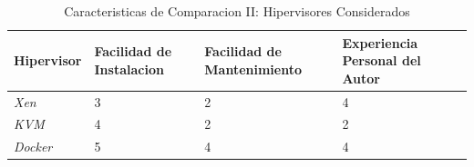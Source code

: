 \begin{table}
	\centering
	\begin{tabular}{|p{1.85cm}|p{2.2cm}|p{3.0cm}|p{1.9cm}|}
    	\hline
		\textbf{Hipervisor} & \textbf{Facilidad de Instalacion} & \textbf{Facilidad de Mantenimiento} & \textbf{Experiencia Personal del Autor} \\
        \hline
        \textit{Xen} & 3 & 2 & 4 \\
        \hline
        \textit{KVM} & 4 & 2 & 2 \\
        \hline
        \textit{Docker} & 5 & 4 & 4 \\
        \hline
	\end{tabular}
    \caption{Caracteristicas de Comparacion II: Hipervisores Considerados}
    \label{tab:hipervisor-compar-ii}
\end{table}

